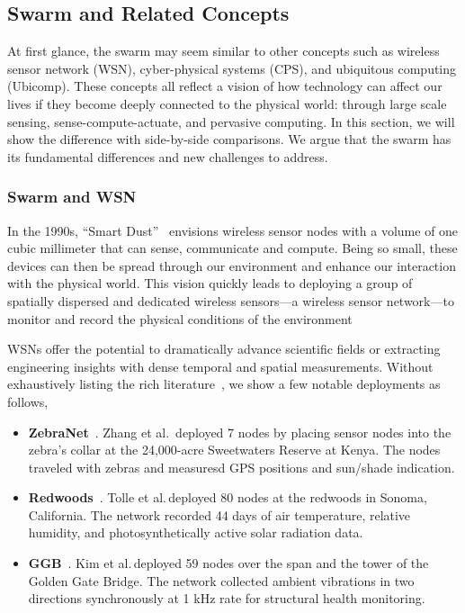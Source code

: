 \subsection{Swarm and Related Concepts}
\label{sec:swarm-relat-conc}

At first glance, the swarm may seem similar to other concepts such as wireless
sensor network (WSN), cyber-physical systems (CPS), and ubiquitous computing
(Ubicomp). These concepts all reflect a vision of how technology can affect our
lives if they become deeply connected to the physical world: through large scale
sensing, sense-compute-actuate, and pervasive computing. In this section, we
will show the difference with side-by-side comparisons. We argue that the swarm
has its fundamental differences and new challenges to address.

\subsubsection{Swarm and WSN}
\label{sec:swarm-wsn}

In the 1990s, ``Smart Dust''~\cite{kahn1999next} envisions wireless sensor nodes
with a volume of one cubic millimeter that can sense, communicate and
compute. Being so small, these devices can then be spread through our
environment and enhance our interaction with the physical world. This vision
quickly leads to deploying a group of spatially dispersed and dedicated wireless
sensors---a wireless sensor network---to monitor and record the physical
conditions of the environment

WSNs offer the potential to dramatically advance scientific fields or extracting
engineering insights with dense temporal and spatial measurements. Without
exhaustively listing the rich literature~\cite{akyildiz2002wireless,
  zhao2009wireless}, we show a few notable deployments as follows,

\begin{itemize}[itemsep=5pt]
\item \textbf{ZebraNet}~\cite{zhang2005habitat}. Zhang et al.\, deployed 7 nodes
  by placing sensor nodes into the zebra's collar at the 24,000-acre Sweetwaters
  Reserve at Kenya. The nodes traveled with zebras and measuresd GPS positions
  and sun/shade indication.
\item \textbf{Redwoods}~\cite{tolle2005macroscope}. Tolle et al.\,deployed 80
  nodes at the redwoods in Sonoma, California. The network recorded 44 days of
  air temperature, relative humidity, and photosynthetically active solar
  radiation data.
\item \textbf{GGB}~\cite{kim2007health}. Kim et al.\,deployed 59 nodes over the
  span and the tower of the Golden Gate Bridge. The network collected ambient
  vibrations in two directions synchronously at 1 kHz rate for structural health
  monitoring.
\end{itemize}

